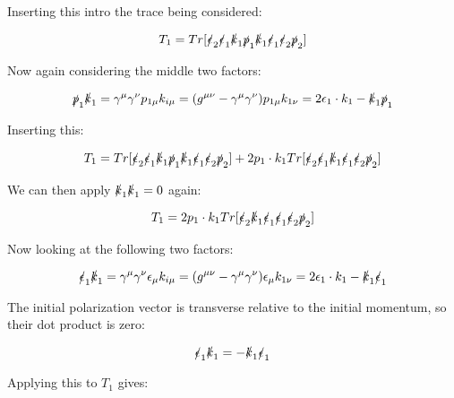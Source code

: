 \documentclass[a4]{article}
\begin{document}
    Inserting this intro the trace being considered:

    \begin{equation}
        T_1 = Tr [\slashed{\epsilon}_2 \slashed{\epsilon}_1 \slashed{k}_1 \slashed{p}_1 \slashed{k}_1 \slashed{\epsilon}_1 \slashed{\epsilon}_2 \slashed{p}_2]
    \end{equation}

    Now again considering the middle two factors:

    \begin{equation}
        \slashed{p}_1 \slashed{k}_1 = \gamma^\mu \gamma^\nu p_{1 \mu} k_{i \mu} = (g^{\mu \nu} - \gamma^\mu \gamma^\nu) p_{1 \mu} k_{1 \nu} = 2 \epsilon_1 \cdot k_1 - \slashed{k}_1 \slashed{p}_1
    \end{equation}

    Inserting this:

    \begin{equation}
        T_1 = Tr [\slashed{\epsilon}_2 \slashed{\epsilon}_1 \slashed{k}_1 \slashed{p}_1 \slashed{k}_1 \slashed{\epsilon}_1 \slashed{\epsilon}_2 \slashed{p}_2] + 2 p_1 \cdot k_1 Tr[\slashed{\epsilon}_2 \slashed{\epsilon}_1 \slashed{k}_1 \slashed{\epsilon}_1 \slashed{\epsilon}_2 \slashed{p}_2]
    \end{equation}

    We can then apply $\slashed{k}_1 \slashed{k}_1 = 0$ again:

    \begin{equation}
        T_1 = 2 p_1 \cdot k_1 Tr[\slashed{\epsilon}_2 \slashed{k}_1 \slashed{\epsilon}_1 \slashed{\epsilon}_1 \slashed{\epsilon}_2 \slashed{p}_2]
    \end{equation}

    Now looking at the following two factors:

    \begin{equation}
        \slashed{\epsilon}_1 \slashed{k}_1 = \gamma^\mu \gamma^\nu \epsilon_\mu k_{i \mu} = (g^{\mu \nu} - \gamma^\mu \gamma^\nu) \epsilon_{\mu} k_{1 \nu} = 2 \epsilon_1 \cdot k_1 - \slashed{k}_1 \slashed{\epsilon}_1
    \end{equation}

    The initial polarization vector is transverse relative to the initial momentum, so their dot product is zero:

    \[
        \slashed{\epsilon}_1 \slashed{k}_1 = - \slashed{k}_1 \slashed{\epsilon}_1
    \]

    Applying this to $T_1$ gives:
\end{document}
